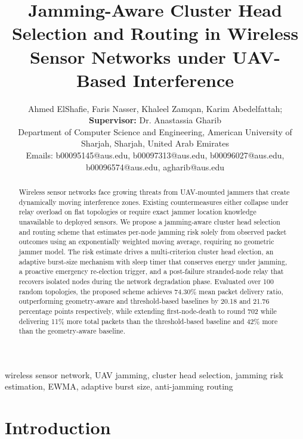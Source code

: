 \documentclass[conference]{IEEEtran}
\begin{document}
\title{Jamming-Aware Cluster Head Selection and Routing in Wireless Sensor Networks under UAV-Based Interference}

\author{Ahmed ElShafie, Faris Nasser, Khaleel Zamqan, Karim Abedelfattah; \textbf{Supervisor:} Dr. Anastassia Gharib\\
Department of Computer Science and Engineering, American University of Sharjah, Sharjah, United Arab Emirates\\
Emails: b00095145@aus.edu, b00097313@aus.edu, b00096027@aus.edu, b00096574@aus.edu, agharib@aus.edu
}

\maketitle

\begin{abstract}
Wireless sensor networks face growing threats from UAV-mounted jammers
that create dynamically moving interference zones. Existing
countermeasures either collapse under relay overload on flat topologies
or require exact jammer location knowledge unavailable to deployed
sensors. We propose a jamming-aware cluster head selection and routing
scheme that estimates per-node jamming risk solely from observed packet
outcomes using an exponentially weighted moving average, requiring no
geometric jammer model. The risk estimate drives a multi-criterion
cluster head election, an adaptive burst-size mechanism with sleep timer
that conserves energy under jamming, a proactive emergency re-election
trigger, and a post-failure stranded-node relay that recovers isolated
nodes during the network degradation phase. Evaluated over 100 random
topologies, the proposed scheme achieves 74.30\% mean packet delivery
ratio, outperforming geometry-aware and threshold-based baselines by
20.18 and 21.76 percentage points respectively, while extending
first-node-death to round 702 while delivering 11\% more total packets
than the threshold-based baseline and 42\% more than the geometry-aware
baseline.
\end{abstract}

\begin{IEEEkeywords}
    wireless sensor network, UAV jamming, cluster head selection,
    jamming risk estimation, EWMA, adaptive burst size, anti-jamming routing
\end{IEEEkeywords}

\section{Introduction}
\end{document}
